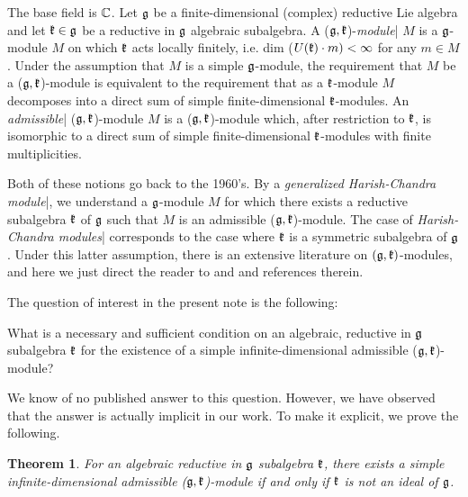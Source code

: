 \documentclass[12pt]{amsart}
\makeatletter
\def\mathbb{\Bbb}
\def\mathfrak{\frak}
\def\emph#1{{\em #1}}
\def\@putname#1#2#3#4{\def\@@ref{#3}\let\old@bf\bf
        \def\bf##1{\old@bf\if?\noexpand##1?{#4}\else##1\fi}%
        #1{#2}%
        \let\bf\old@bf}
\def\@putname#1#2#3#4{\def\@@ref{#3}\let\old@bf\bf    %
        \let\old@reset@font\reset@font                  %
        \def\bf##1{\old@bf\if?\noexpand##1?{#4}\else##1\fi}%
        \def\reset@font##1##2{\old@reset@font##1\if?\noexpand##2?{#4}\else##2\fi}#1{#2}%
        \let\bf\old@bf\let\reset@font\old@reset@font}
\let\my@cite=\cite
\def\cite#1{\@putname\my@cite{#1}{\@citeb}{\tiny\rm\@@ref}}
\theoremstyle{plain} %
\let\emphOrig\emph
\def\eatToBar#1|{}
\def\emphToIndexSLASH#1\/{\index{#1}\eatToBar}
\def\emphToIndexDOTSLASH#1.\/{\emphToIndexSLASH #1\/}
\def\emphAndIndex#1{\emphOrig{#1}{\emphToIndexDOTSLASH #1.\/|}}
\let\emph\emphAndIndex
\numberwithin{equation}{section}
\theoremstyle{definition}
\theoremstyle{remark}
\theoremstyle{plain} %
\newtheorem*{theor*}{Theorem}
\newcommand{\fg}{\mathfrak{g}}
\newcommand{\fk}{\mathfrak{k}}
\makeatother
\begin{document}
The base field is $\mathbb{C}$. Let $\fg$ be a finite-dimensional (complex) reductive Lie algebra and let $\fk \in \fg$ be a reductive in $\fg$ algebraic subalgebra. A ($\fg, \fk$)-\emph{module} $M$ is a $\fg$-module $M$ on which $\fk$ acts locally finitely, i.e. dim ($U(\fk)\cdot m) < \infty$ for any $m\in M$. Under the assumption that $M$ is a simple $\fg$-module, the requirement that $M$ be a ($\fg,\fk$)-module is equivalent to the requirement that as a $\fk$-module $M$ decomposes into a direct sum of simple finite-dimensional $\fk$-modules. An \emph{admissible}  ($\fg,\fk$)-module $M$ is a  ($\fg,\fk$)-module which, after restriction to $\fk$, is isomorphic to a direct sum of simple finite-dimensional $\fk$-modules with finite multiplicities.

Both of these notions go back to the 1960's. By a \emph{generalized Harish-Chandra module}, we understand a $\fg$-module $M$ for which there exists a reductive subalgebra $\fk$ of $\fg$ such that $M$ is an admissible  ($\fg,\fk$)-module. The case of \emph{Harish-Chandra modules} corresponds to the case where  $\fk$ is a symmetric subalgebra of $\fg$. Under this latter assumption, there is an extensive literature on $(\fg,\fk)$-modules, and here we just direct the reader to \cite{V} and \cite{KV} and references therein.

The question of interest in the present note is the following:


What is a necessary and sufficient condition on an algebraic, reductive in $\fg$ subalgebra $\fk$ for the existence of a simple infinite-dimensional admissible  ($\fg,\fk$)-module?

We know of no published answer to this question. However, we have observed that the answer is actually implicit in our work. To make it explicit, we  prove the following.

\begin{theor*}
For an algebraic reductive in $\fg$ subalgebra $\fk$, there exists a simple infinite-dimensional admissible  ($\fg,\fk$)-module if and only if $\fk$ is not an ideal of $\fg$. 
\end{theor*}
\end{document}

